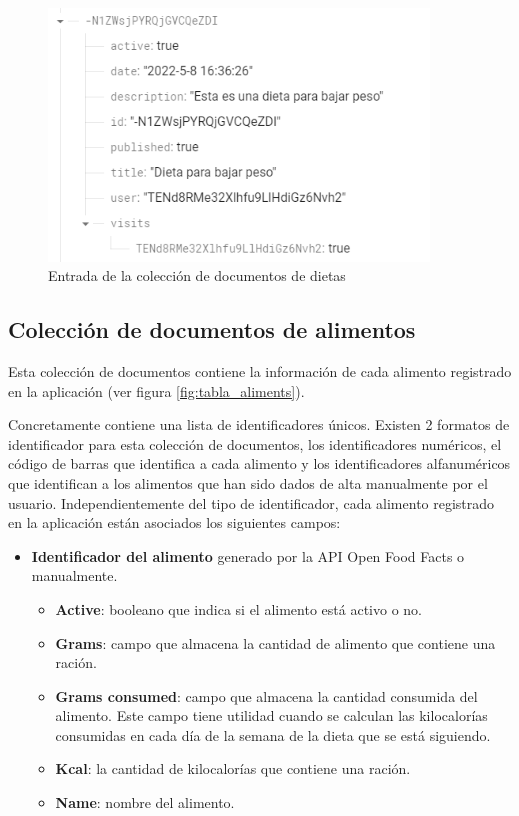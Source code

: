 \begin{figure}[H]
    \centering
    \includegraphics[width=0.9\textwidth]{Images/Capitulo5/tabla_diet.png}
    \caption{Entrada de la colección de documentos de dietas}
    \label{fig:tabla_diet}
\end{figure}


\subsection{Colección de documentos de alimentos}
Esta colección de documentos contiene la información de cada alimento registrado en la aplicación (ver figura \ref{fig:tabla_aliments}).

Concretamente contiene una lista de identificadores únicos. Existen 2 formatos de identificador para esta colección de documentos, los identificadores numéricos, el código de barras que identifica a cada alimento y los identificadores alfanuméricos que identifican a los alimentos que han sido dados de alta manualmente por el usuario. Independientemente del tipo de identificador, cada alimento registrado en la aplicación están asociados los siguientes campos:

\begin{itemize}
\item \textbf{Identificador del alimento} generado por la API Open Food Facts o manualmente.
    \begin{itemize}
        \item \textbf{Active}: booleano que indica si el alimento está activo o no.
        \item \textbf{Grams}: campo que almacena la cantidad de alimento que contiene una ración.
        \item \textbf{Grams consumed}: campo que almacena la cantidad consumida del alimento. Este campo tiene utilidad cuando se calculan las kilocalorías consumidas en cada día de la semana de la dieta que se está siguiendo.
        \item \textbf{Kcal}: la cantidad de kilocalorías que contiene una ración.
        \item \textbf{Name}: nombre del alimento.
    \end{itemize}    
\end{itemize}

